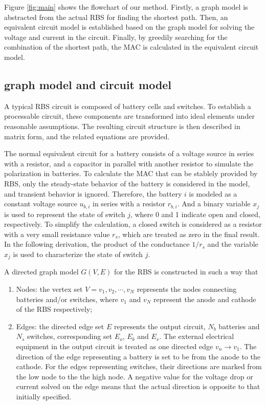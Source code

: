 \documentclass{article}
\begin{document}
Figure \ref{fig:main} shows the flowchart of our method.
Firstly, a graph model is abstracted from the actual RBS for finding the shortest path.
Then, an equivalent circuit model is established based on the graph model for solving the voltage and current in the circuit.
Finally, by greedily searching for the combination of the shortest path, the MAC is calculated in the equivalent circuit model.
\subsection{graph model and circuit model}

A typical RBS circuit is composed of battery cells and switches.
To establish a processable circuit, these components are transformed into ideal elements under reasonable assumptions.
The resulting circuit structure is then described in matrix form, and the related equations are provided.


The normal equivalent circuit for a battery consists of a voltage source in series with a resistor, and a capacitor in parallel with another resistor to simulate the polarization in batteries.
To calculate the MAC that can be stablely provided by RBS, only the steady-state behavior of the battery is considered in the model, and transient behavior is ignored.
Therefore, the battery $i$ is modeled as a constant voltage source $u_{b,i}$ in series with a resistor $r_{b,i}$.
And a binary variable $x_j$ is used to represent the state of switch $j$, where 0 and 1 indicate open and closed, respectively.
To simplify the calculation, a closed switch is considered as a resistor with a very small resistance value $r_s$, which are treated as zero in the final result.
In the following derivation, the product of the conductance $1/r_s$ and the variable $x_j$ is used to characterize the state of switch $j$.


A directed graph model $G(V,E)$ for the RBS is constructed in such a way that
\begin{enumerate}[(1)]
    \item Nodes: the vertex set $V={v_1,v_2,\cdots,v_N}$ represents the nodes connecting batteries and/or switches, where $v_1$ and $v_N$ represent the anode and cathode of the RBS respectively;
    \item Edges: the directed edge set $E$ represents the output circuit, $N_b$ batteries and $N_s$ switches, corresponding set $E_o$, $E_b$ and $E_s$. The external electrical equipment in the output circuit is treated as one directed edge $v_n \to v_1$. The direction of the edge representing a battery is set to be from the anode to the cathode. For the edges representing switches, their directions are marked from the low node to the the high node. A negative value for the voltage drop or current solved on the edge means that the actual direction is opposite to that initially specified.
\end{enumerate}
\end{document}
